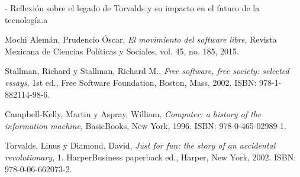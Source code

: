 \documentclass[a4paper,12pt]{article}
\begin{document}
- Reflexión sobre el legado de Torvalds y su impacto en el futuro de la
tecnología.a
\newpage

\begin{thebibliography}{9}

Mochi Alemán, Prudencio Óscar, \textit{El movimiento del software libre}, Revista Mexicana de Ciencias Políticas y Sociales, vol. 45, no. 185, 2015.

Stallman, Richard y Stallman, Richard M., \textit{Free software, free society: selected essays}, 1st ed., Free Software Foundation, Boston, Mass, 2002. ISBN: 978-1-882114-98-6.

Campbell-Kelly, Martin y Aspray, William, \textit{Computer: a history of the information machine}, BasicBooks, New York, 1996. ISBN: 978-0-465-02989-1.

Torvalds, Linus y Diamond, David, \textit{Just for fun: the story of an accidental revolutionary}, 1. HarperBusiness paperback ed., Harper, New York, 2002. ISBN: 978-0-06-662073-2.

\end{thebibliography}
\end{document}
